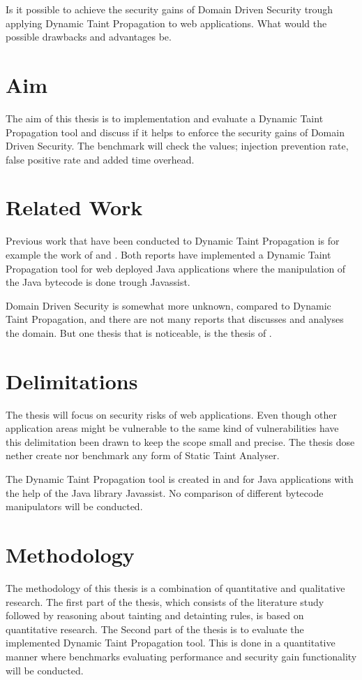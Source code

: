 \noindent
Is it possible to achieve the security gains of Domain Driven Security trough applying Dynamic Taint Propagation to web applications. What would the possible drawbacks and advantages be.


\section{Aim}
The aim of this thesis is to implementation and evaluate a Dynamic Taint Propagation tool and discuss if it helps to enforce the security gains of Domain Driven Security. The benchmark will check the values; injection prevention rate, false positive rate and added time overhead. 


\section{Related Work}
Previous work that have been conducted to Dynamic Taint Propagation is for example the work of \textcite{Haldar} and \textcite{Zhao2016}. Both reports have implemented a Dynamic Taint Propagation tool for web deployed Java applications where the manipulation of the Java bytecode is done trough Javassist.

Domain Driven Security is somewhat more unknown, compared to Dynamic Taint Propagation, and there are not many reports that discusses and analyses the domain. But one thesis that is noticeable, is the thesis of \textcite{Stendahl2016}.


\section{Delimitations}
The thesis will focus on security risks of web applications. Even though other application areas might be vulnerable to the same kind of vulnerabilities have this delimitation been drawn to keep the scope small and precise. The thesis dose nether create nor benchmark any form of Static Taint Analyser. 

The Dynamic Taint Propagation tool is created in and for Java applications with the help of the Java library Javassist. No comparison of different bytecode manipulators will be conducted.

\section{Methodology}
The methodology of this thesis is a combination of quantitative and qualitative research. The first part of the thesis, which consists of the literature study followed by reasoning about tainting and detainting rules, is based on quantitative research. The Second part of the thesis is to evaluate the implemented Dynamic Taint Propagation tool. This is done in a quantitative manner where benchmarks evaluating performance and security gain functionality will be conducted.
